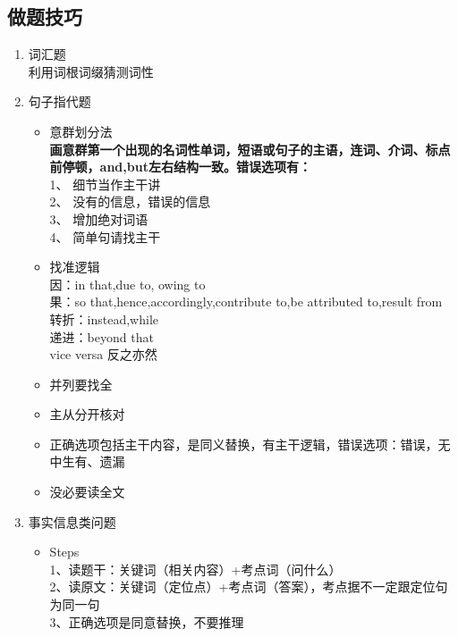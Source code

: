 \documentclass[UTF8]{ctexart}
\begin{document}
\subsection{做题技巧}
\begin{enumerate}[A]
  \item 词汇题\\
  利用词根词缀猜测词性\\
  \item 句子指代题\\
  \begin{itemize}
  \item 意群划分法\\
\textbf{画意群第一个出现的名词性单词，短语或句子的主语，连词、介词、标点前停顿，and,but左右结构一致。错误选项有：}\\
  1、 细节当作主干讲\\
  2、 没有的信息，错误的信息\\
  3、 增加绝对词语\\
  4、 简单句请找主干\\
  \item 找准逻辑\\
  因：in that,due to, owing to\\
  果：so that,hence,accordingly,contribute to,be attributed to,result from\\
  转折：instead,while\\
  递进：beyond that\\
  vice versa 反之亦然\\
  \item 并列要找全\\
  \item 主从分开核对\\
  \item 正确选项包括主干内容，是同义替换，有主干逻辑，错误选项：错误，无中生有、遗漏\\
  \item 没必要读全文\\
  \end{itemize}
  \item 事实信息类问题\\
  \begin{itemize}
    \item Steps\\
    1、读题干：关键词（相关内容）+考点词（问什么）\\
    2、读原文：关键词（定位点）+考点词（答案），考点据不一定跟定位句为同一句\\
    3、正确选项是同意替换，不要推理\\

\end{itemize}
\end{enumerate}
\end{document}
